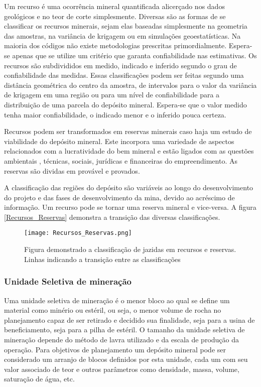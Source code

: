Um recurso é uma ocorrência mineral quantificada alicerçado nos dados geológicos e no teor de corte simplesmente. Diversas são as formas de se classificar os recursos minerais, sejam elas baseadas simplesmente na geometria das amostras, na variância de krigagem ou em simulações geoestatísticas. Na maioria dos códigos não existe metodologias prescritas primordialmente. Espera-se apenas que se utilize um critério que garanta confiabilidade nas estimativas. Os recursos são subdivididos em medido, indicado e inferido segundo o grau de confiabilidade das medidas. Essas classificações podem ser feitas segundo uma distância geométrica do centro da amostra, de intervalos para o valor da variância de krigagem em uma região ou para um nível de confiabilidade para a distribuição de uma parcela do depósito mineral. Espera-se que o valor medido tenha maior confiabilidade, o indicado menor e o inferido pouca certeza.
  

Recursos podem ser transformados em reservas minerais caso haja um estudo de viabilidade do depósito mineral. Este incorpora uma variedade de aspectos relacionados com a lucratividade do bem mineral e estão ligados com as questões ambientais , técnicas, sociais, jurídicas e financeiras do empreendimento. As reservas são dividas em provável e provados. 

A classificação das regiões do depósito são variáveis ao longo do desenvolvimento do projeto e das fases de desenvolvimento da mina, devido ao acréscimo de informação. Um recurso pode se tornar uma reserva mineral e vice-versa. A figura \eqref{Recursos_Reservas} demonstra a transição das diversas classificações. 

\begin{figure}[H]
\centering
\texttt{[image: Recursos\_Reservas.png]}	
\caption{Figura demonstrado a classificação de jazidas em recursos e reservas. Linhas indicando a transição entre as classificações }
\label{Recursos_Reservas}
\end{figure}

\subsubsection{Unidade Seletiva de mineração}

Uma unidade seletiva de mineração é o menor bloco ao qual se define um material como minério ou estéril, ou seja, o menor volume de rocha no planejamento capaz de ser retirado e decidido sua finalidade, seja para a usina de beneficiamento, seja para a pilha de estéril. O tamanho da unidade seletiva de mineração depende do método de lavra utilizado e da escala de produção da operação. Para objetivos de planejamento um depósito mineral pode ser considerado um arranjo de blocos definidos por esta unidade, cada um com seu valor associado de teor e outros parâmetros como densidade, massa, volume, saturação de água, etc. 

